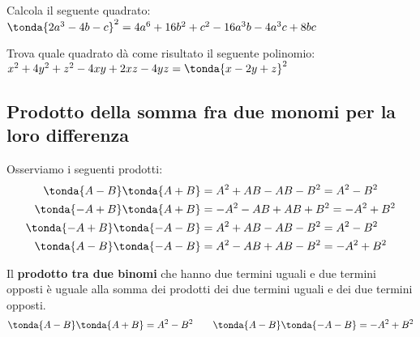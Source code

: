\begin{esempio}{}{} 
Calcola il seguente quadrato:\\
\(\tonda{2a^3-4b-c}^2 = 4a^6 + 16b^2 +c^2 -16a^3 b -4 a^3 c +8 bc\)
\end{esempio}

\begin{esempio}{}{} 
Trova quale quadrato dà come risultato il seguente 
polinomio:\\
\(x^2 + 4y^2 + z^2 -4xy +2xz -4yz = \tonda{x-2y+z}^2\)
\end{esempio}


\subsection{Prodotto della somma fra due monomi per la loro differenza}
\label{subsec:prodnot_sommaperdifferenza}

Osserviamo i seguenti prodotti:
\begin{align*}
\tonda{A-B}\tonda{A+B}   &= A^{2}+{AB}-{AB}-B^{2}=A^{2}-B^{2}\\
\tonda{-A+B}\tonda{A+B}  &= -A^{2}-{AB}+{AB}+B^{2}=-A^{2}+B^{2}\\
\tonda{-A+B}\tonda{-A-B} &= A^{2}+{AB}-{AB}-B^{2}=A^{2}-B^{2}\\
\tonda{A-B}\tonda{-A-B}  &= A^{2}-{AB}+{AB}-B^{2}=-A^{2}+B^{2}
\end{align*}


\begin{definizione}{}{} 
Il \textbf{prodotto tra due binomi} che hanno due termini uguali e
due termini opposti è uguale alla somma dei prodotti dei due termini 
uguali e dei due termini opposti.
\[\tonda{A-B}\tonda{A+B} = A^{2} - B^{2} \qquad
  \tonda{A-B}\tonda{-A-B} = -A^{2} + B^{2}\]
\end{definizione}

